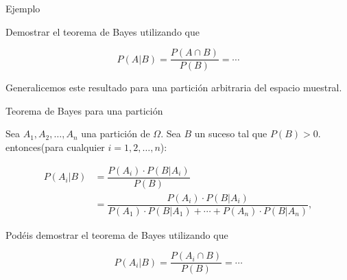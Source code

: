 \documentclass[
  letterpaper,
  DIV=11,
  numbers=noendperiod]{scrreprt}
\begin{document}
\begin{Ejemplo}{Ejemplo}{}

Demostrar el teorema de Bayes utilizando que

\[P(A|B) =\dfrac{P(A\cap B)}{P(B)}=\cdots\]

\end{Ejemplo}

Generalicemos este resultado para una partición arbitraria del espacio
muestral.

\begin{Teorema}{Teorema de Bayes para una partición}{}

Sea \(A_1,A_2,\ldots,A_n\) una partición de \(\Omega\). Sea \(B\) un
suceso tal que \(P(B)>0\). entonces(para cualquier \(i=1,2,\ldots,n\)):

\[
\begin{array}{rl}
P(A_i|B) & =\dfrac{P(A_i)\cdot P(B|A_i)}{P(B)}\\
& =\dfrac{P(A_i)\cdot P(B|A_i)}{P(A_1)\cdot P(B|A_1)+\cdots+P(A_n)\cdot P(B|A_n)},
\end{array}
\]

\end{Teorema}

Podéis demostrar el teorema de Bayes utilizando que

\[P(A_i|B) =\dfrac{P(A_i\cap B)}{P(B)}=\cdots\]
\end{document}
